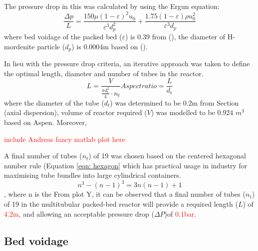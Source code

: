 The pressure drop in this was calculated by using the Ergun equation: 
\begin{equation}
    \frac{\Delta p}{L} = \frac{150 \mu (1- \varepsilon)^2 u_0}{\varepsilon^3 d_p^2} + \frac{1.75(1-\varepsilon)\rho u_0^2}{\varepsilon^3 d_p}
    \label{eqn:ergun}
\end{equation}
where bed voidage of the packed bed ($\varepsilon$) is 0.39 from (), the diameter of H-mordenite particle ($d_p$) is 0.0004m based on (). 

In lieu with the pressure drop criteria, an iterative approach was taken to define the optimal length, diameter and number of tubes in the reactor. 
\begin{equation}
    L= \frac{V}{\frac{\pi d_t^2}{4}\cdot n_t}
    Aspect ratio = \frac{L}{d_t}
    \label{eqn:pressuredrop}
\end{equation}
where the diameter of the tube ($d_t$) was determined to be 0.2m from Section (axial dispersion), volume of reactor required ($V$) was modelled to be 0.924 $m^3$ based on Aspen. Moreover, 

\textcolor{red}{include Andreas fancy matlab plot here}

A final number of tubes ($n_t$) of 19 was chosen based on the centered hexagonal number rule (Equation \ref{eqn: hexagon} which has practical usage in industry for maximising tube bundles into large cylindrical containers. 
\begin{equation}
    n^3 - (n-1)^3 = 3n(n-1)+1
    \label{eqn: hexagon}
\end{equation},
where n is the 
From plot Y, it can be observed that a final number of tubes ($n_t$) of 19 in the multitubular packed-bed reactor will provide a required length ($L$) of \textcolor{red}{4.2m}, and allowing an acceptable pressure drop ($\Delta P$)of \textcolor{red}{0.1bar}.  

\subsection{Bed voidage}